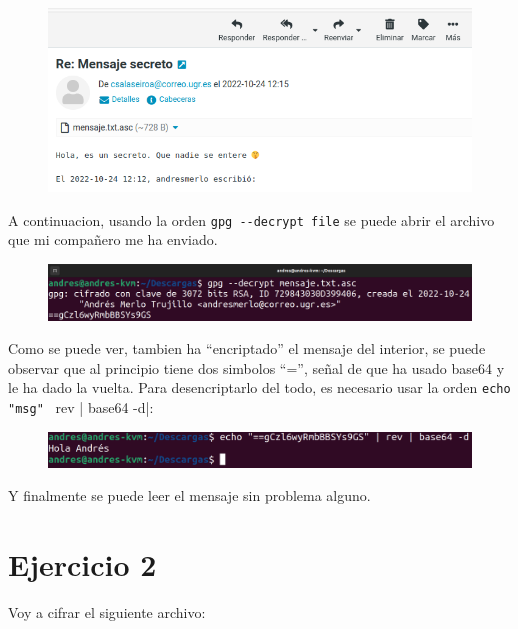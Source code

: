 \documentclass{article}
\begin{document}
\begin{figure}[H]
    \includegraphics[width=\textwidth]{imagenes/Portatil/Captura desde 2022-10-24 12-16-48.png}
\end{figure}

A continuacion, usando la orden \verb|gpg --decrypt file| se puede abrir el archivo que mi compañero me ha enviado.

\begin{figure}[H]
    \includegraphics[width=\textwidth]{imagenes/Portatil/Captura desde 2022-10-24 12-18-40.png}
\end{figure}

Como se puede ver, tambien ha ``encriptado'' el mensaje del interior, se puede observar que al principio tiene dos simbolos ``='', señal de que ha usado base64 y le ha dado la vuelta. Para desencriptarlo del todo, es necesario usar la orden \verb|echo "msg" | rev | base64 -d|:

\begin{figure}[H]
    \includegraphics[width=\textwidth]{imagenes/Portatil/base64.png}
\end{figure}

Y finalmente se puede leer el mensaje sin problema alguno.

\section*{Ejercicio 2}

Voy a cifrar el siguiente archivo:
\end{document}
